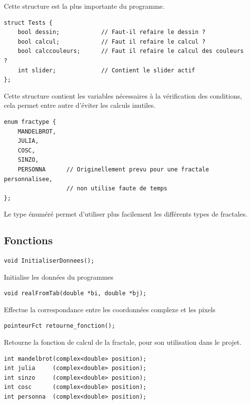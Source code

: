 \documentclass[a4paper,11pt]{article} \usepackage[T1]{fontenc} \usepackage[utf8]{inputenc} \usepackage[francais]{babel}
\begin{document}
Cette structure est la plus importante du programme.

\begin{lstlisting}
struct Tests {
    bool dessin;            // Faut-il refaire le dessin ?
    bool calcul;            // Faut il refaire le calcul ?
    bool calccouleurs;      // Faut il refaire le calcul des couleurs ?
    int slider;             // Contient le slider actif
};\end{lstlisting}

Cette structure contient les variables nécessaires à la vérification des conditions, cela permet entre autre d’éviter les calculs inutiles.

\begin{lstlisting}
enum fractype {
    MANDELBROT,
    JULIA,
    COSC,
    SINZO,
    PERSONNA      // Originellement prevu pour une fractale personnalisee,
                  // non utilise faute de temps
};\end{lstlisting}

Le type énuméré permet d'utiliser plus facilement les différents types de fractales.\\

\subsection{Fonctions}
\begin{lstlisting}
void InitialiserDonnees(); \end{lstlisting}

Initialise les données du programmes

\begin{lstlisting}
void realFromTab(double *bi, double *bj);\end{lstlisting}

Effectue la correspondance entre les coordonnées complexe et les pixels

\begin{lstlisting}
pointeurFct retourne_fonction();\end{lstlisting}

Retourne la fonction de calcul de la fractale, pour son utilisation dans le projet. 

\begin{lstlisting}
int mandelbrot(complex<double> position);
int julia     (complex<double> position);
int sinzo     (complex<double> position);
int cosc      (complex<double> position);
int personna  (complex<double> position);\end{lstlisting}
\end{document}
